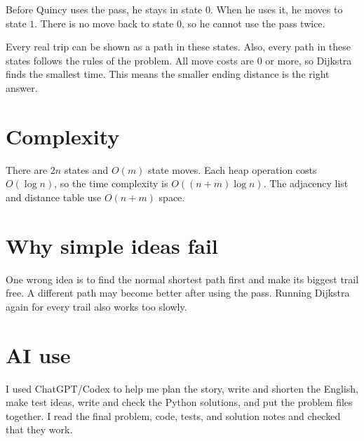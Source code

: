 \documentclass[10pt,a4paper]{article}
\begin{document}
Before Quincy uses the pass, he stays in state $0$. When he uses it, he moves to state $1$. There is no move back to state $0$, so he cannot use the pass twice.

Every real trip can be shown as a path in these states. Also, every path in these states follows the rules of the problem. All move costs are $0$ or more, so Dijkstra finds the smallest time. This means the smaller ending distance is the right answer.

\section*{Complexity}

There are $2n$ states and $O(m)$ state moves. Each heap operation costs $O(\log n)$, so the time complexity is $O((n+m)\log n)$. The adjacency list and distance table use $O(n+m)$ space.

\section*{Why simple ideas fail}

One wrong idea is to find the normal shortest path first and make its biggest trail free. A different path may become better after using the pass. Running Dijkstra again for every trail also works too slowly.

\section*{AI use}

I used ChatGPT/Codex to help me plan the story, write and shorten the English, make test ideas, write and check the Python solutions, and put the problem files together. I read the final problem, code, tests, and solution notes and checked that they work.
\end{document}
